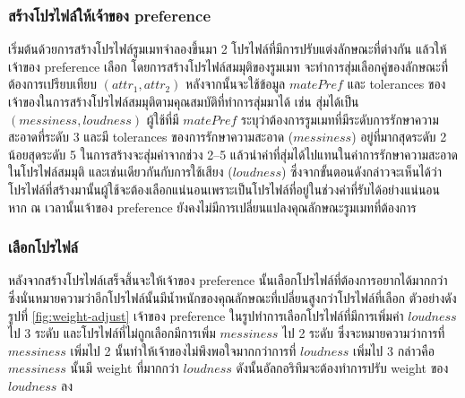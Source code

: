 \subsubsection{สร้างโปรไฟล์ให้เจ้าของ preference}
เริ่มต้นด้วยการสร้างโปรไฟล์รูมเมทจำลองขึ้นมา 2 โปรไฟล์ที่มีการปรับแต่งลักษณะที่ต่างกัน แล้วให้เจ้าของ preference เลือก 
โดยการสร้างโปรไฟล์สมมุติของรูมเมท จะทำการสุ่มเลือกคู่ของลักษณะที่ต้องการเปรียบเทียบ $(\mathit{attr}_1, \mathit{attr}_2)$ หลังจากนั้นจะใช้ข้อมูล 
$\mathit{matePref}$ และ tolerances ของเจ้าของในการสร้างโปรไฟล์สมมุติตามคุณสมบัติที่ทำการสุ่มมาได้ เช่น สุ่มได้เป็น $(\mathit{messiness}, \mathit{loudness})$ 
ผู้ใช้ที่มี $\mathit{matePref}$ ระบุว่าต้องการรูมเมทที่มีระดับการรักษาความสะอาดที่ระดับ 3 และมี tolerances ของการรักษาความสะอาด ($\mathit{messiness}$) อยู่ที่มากสุดระดับ 2 
น้อยสุดระดับ 5 ในการสร้างจะสุ่มค่าจากช่วง 2--5 แล้วนำค่าที่สุ่มได้ไปแทนในค่าการรักษาความสะอาดในโปรไฟล์สมมุติ และเช่นเดียวกันกับการใช้เสียง ($\mathit{loudness}$)
ซึ่งจากขั้นตอนดังกล่าวจะเห็นได้ว่าโปรไฟล์ที่สร้างมานั้นผู้ใช้จะต้องเลือกแน่นอนเพราะเป็นโปรไฟล์ที่อยู่ในช่วงค่าที่รับได้อย่างแน่นอน หาก ณ เวลานั้นเจ้าของ preference 
ยังคงไม่มีการเปลี่ยนแปลงคุณลักษณะรูมเมทที่ต้องการ

\subsubsection{เลือกโปรไฟล์}
หลังจากสร้างโปรไฟล์เสร็จสิ้นจะให้เจ้าของ preference นั้นเลือกโปรไฟล์ที่ต้องการอยากได้มากกว่า ซึ่งนั่นหมายความว่าอีกโปรไฟล์นั้นมีน้ำหนักของคุณลักษณะที่เปลี่ยนสูงกว่าโปรไฟล์ที่เลือก
ตัวอย่างดังรูปที่ \ref{fig:weight-adjust} เจ้าของ preference ในรูปทำการเลือกโปรไฟล์ที่มีการเพิ่มค่า $\mathit{loudness}$ ไป 3 ระดับ และโปรไฟล์ที่ไม่ถูกเลือกมีการเพิ่ม $\mathit{messiness}$ ไป 2 ระดับ
ซึ่งจะหมายความว่าการที่ $\mathit{messiness}$ เพิ่มไป 2 นั้นทำให้เจ้าของไม่พึงพอใจมากกว่าการที่ $\mathit{loudness}$ เพิ่มไป 3 กล่าวคือ $\mathit{messiness}$ นั้นมี weight ที่มากกว่า $\mathit{loudness}$
ดังนั้นอัลกอริทึมจะต้องทำการปรับ weight ของ $\mathit{loudness}$ ลง

